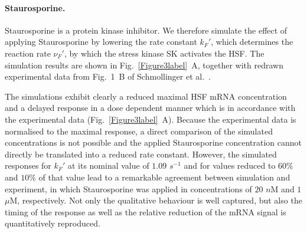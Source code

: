 \documentclass[oneside, 10pt, a4paper, twocolumn]{article}
\begin{document}




\paragraph{Staurosporine.}

Staurosporine is a protein kinase inhibitor.
We therefore simulate the effect of applying Staurosporine by lowering the rate constant $k_F'$, 
which determines the reaction rate $\nu_F'$, by which the stress kinase SK activates the HSF. 
The simulation results are shown in Fig.~\ref{Figure3label}~A, together with redrawn 
experimental data from Fig.~1~B of Schmollinger et al.~\cite{Schmollinger2013}.

The simulations exhibit clearly a reduced maximal HSF mRNA concentration and a delayed response in a dose dependent manner which is in accordance with the experimental data (Fig.~\ref{Figure3label}~A). 
Because the experimental data is normalised 
to the maximal response, a direct comparison of the simulated
concentrations is not possible and the applied Staurosporine
concentration cannot directly be translated into a reduced rate
constant.
However, the simulated responses for $k_F'$ at its nominal value of $1.09$ $s^{-1}$ and for values reduced to $60 \%$ and $10 \%$ of that value lead to a remarkable agreement
between simulation and experiment, in which Staurosporine was applied 
in concentrations of $20$ $n$M and $1$ $\mu$M, respectively.
Not only the qualitative behaviour is well captured, but also the
timing of the response as well as the relative reduction of the mRNA signal
is quantitatively reproduced.

\end{document}
